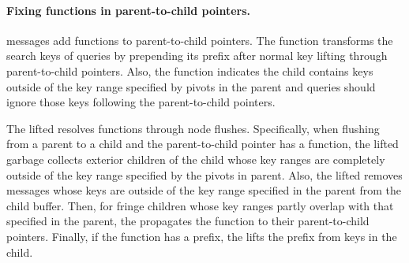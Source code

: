 \paragraph{Fixing \xf functions in parent-to-child pointers.}
\goto messages add \xf functions to parent-to-child pointers.
The \xf function transforms the search keys of queries by prepending its prefix
after normal key lifting through parent-to-child pointers.
Also, the \xf function indicates the child contains keys outside of the key range
specified by pivots in the parent and queries should ignore those keys following
the parent-to-child pointers.

The lifted \bedag resolves \xf functions through node flushes.
Specifically, when flushing from a parent to a child and the parent-to-child
pointer has a \xf function,
the lifted \bedag garbage collects exterior children of the child whose key
ranges are completely outside of the key range specified by the pivots in parent.
Also, the lifted \bedag removes messages whose keys are outside of the key
range specified in the parent from the child buffer.
Then, for fringe children whose key ranges partly overlap with that specified
in the parent, the \bedag propagates the \xf function to their parent-to-child
pointers.
Finally, if the \xf function has a prefix, the \bedag lifts the prefix from
keys in the child.


